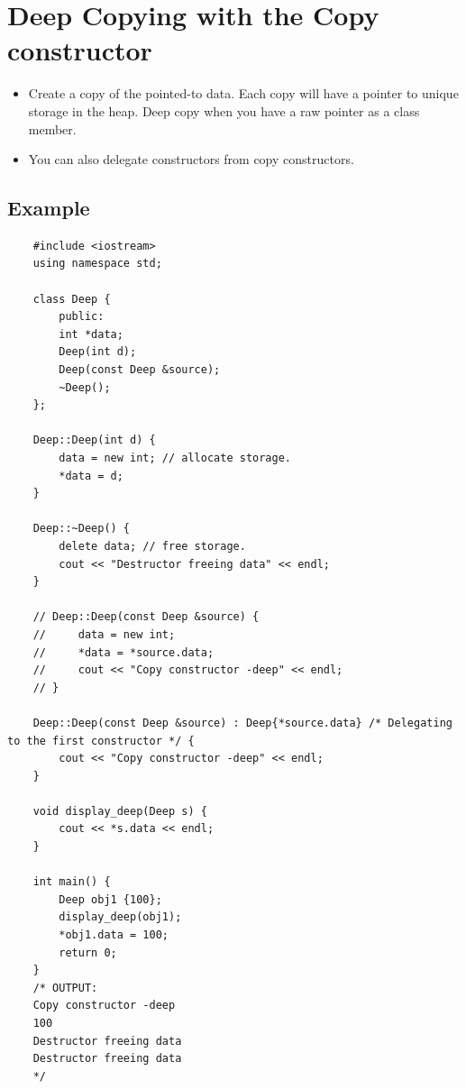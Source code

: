 \section{Deep Copying with the Copy constructor}
\begin{itemize}
    \item Create a copy of the pointed-to data. Each copy will have a pointer to unique storage in the heap. Deep copy when you have a raw pointer as a class member.
    \item You can also delegate constructors from copy constructors.
\end{itemize}

\subsection{Example}
\begin{verbatim}
    #include <iostream>
    using namespace std;

    class Deep {
        public:
        int *data;
        Deep(int d);
        Deep(const Deep &source);
        ~Deep();
    };

    Deep::Deep(int d) {
        data = new int; // allocate storage.
        *data = d;
    }

    Deep::~Deep() {
        delete data; // free storage.
        cout << "Destructor freeing data" << endl;
    }

    // Deep::Deep(const Deep &source) {
    //     data = new int;
    //     *data = *source.data;
    //     cout << "Copy constructor -deep" << endl;
    // }

    Deep::Deep(const Deep &source) : Deep{*source.data} /* Delegating to the first constructor */ {
        cout << "Copy constructor -deep" << endl;
    }

    void display_deep(Deep s) {
        cout << *s.data << endl;
    }

    int main() {
        Deep obj1 {100};
        display_deep(obj1);
        *obj1.data = 100;
        return 0;
    }
    /* OUTPUT:
    Copy constructor -deep
    100
    Destructor freeing data
    Destructor freeing data
    */
\end{verbatim}


